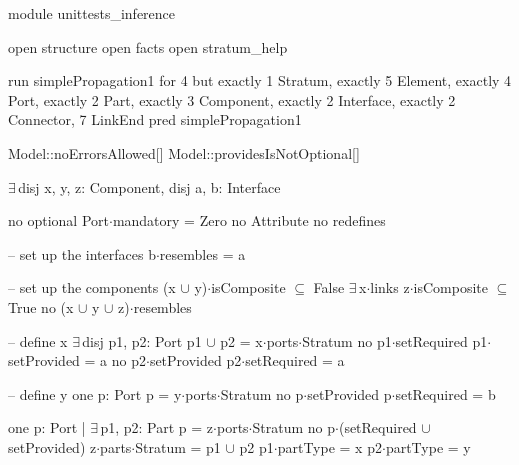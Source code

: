 module unittests_inference

open structure
open facts
open stratum_help


run simplePropagation1 for 4 but exactly 1 Stratum, exactly 5 Element, exactly 4 Port, exactly 2 Part, exactly 3 Component, exactly 2 Interface, exactly 2 Connector, 7 LinkEnd
pred simplePropagation1
{
  Model::noErrorsAllowed[]
  Model::providesIsNotOptional[]

  $\exists\,$disj x, y, z: Component,
       disj a, b: Interface
  {
    no optional
    Port$\cdot$mandatory = Zero
    no Attribute
    no redefines
  
    -- set up the interfaces
    b$\cdot$resembles = a
  
    -- set up the components
    (x $\cup$ y)$\cdot$isComposite $\subseteq$ False
    $\exists\,$x$\cdot$links
    z$\cdot$isComposite $\subseteq$ True
    no (x $\cup$ y $\cup$ z)$\cdot$resembles
    
    -- define x
    $\exists\,$disj p1, p2: Port
    {
      p1 $\cup$ p2 = x$\cdot$ports$\cdot$Stratum
      no p1$\cdot$setRequired
      p1$\cdot$setProvided = a
      no p2$\cdot$setProvided
      p2$\cdot$setRequired = a
    }
    
    -- define y
    one p: Port
    {
      p = y$\cdot$ports$\cdot$Stratum
      no p$\cdot$setProvided
      p$\cdot$setRequired = b
    }
    
    one p: Port | $\exists\,$p1, p2: Part
    {
      p = z$\cdot$ports$\cdot$Stratum
      no p$\cdot$(setRequired $\cup$ setProvided)
      z$\cdot$parts$\cdot$Stratum = p1 $\cup$ p2
      p1$\cdot$partType = x
      p2$\cdot$partType = y
    }
  }
}

